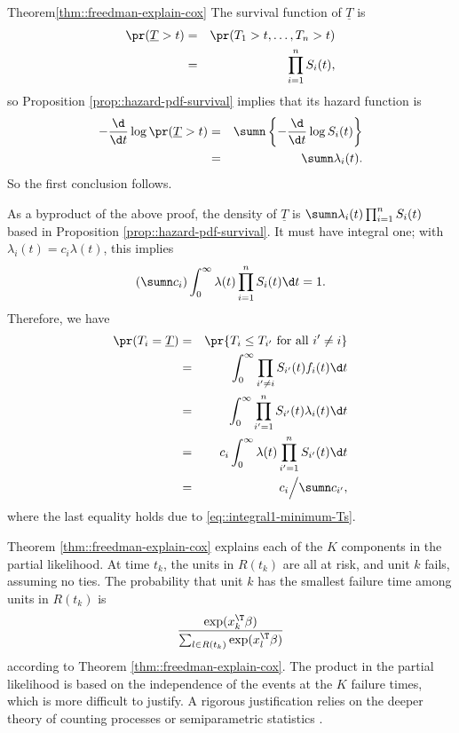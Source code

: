 \begin{myproof}{Theorem}{\ref{thm::freedman-explain-cox}}
The survival function of $\underline{T} $ is
\begin{eqnarray*}
\pr (  \underline{T} > t  ) 
&=& \pr(  T_1>t,\ldots, T_n>t ) \\
&=& \prod_{i=1}^n S_i(t) ,
\end{eqnarray*}
so Proposition \ref{prop::hazard-pdf-survival} implies that its hazard function is
\begin{eqnarray*}
- \frac{\d}{\d t} \log \pr ( \underline{T} > t )  
&=& \sumn \left\{ - \frac{\d}{\d t} \log   S_i(t) \right\} \\
&=& \sumn \lambda_i(t). 
\end{eqnarray*}
So the first conclusion follows. 
 
 
As a byproduct of the above proof, the density of $\underline{T} $ is $\sumn \lambda_i(t) \prod_{i=1}^n S_i(t)$ based in Proposition \ref{prop::hazard-pdf-survival}. It must have integral one; with $\lambda_i(t) = c_i \lambda(t)$, this implies 
\begin{equation}
\left( \sumn c_i  \right) \int_0^{\infty} \lambda(t) \prod_{i=1}^n S_i(t) \d t = 1.
\label{eq::integral1-minimum-Ts}
\end{equation}
Therefore, we have 
\begin{eqnarray*}
\pr ( T_i = \underline{T}   ) 
&=& \pr\{ T_i \leq T_{i'} \text{ for all } i' \neq i  \} \\
&=& \int_0^{\infty}   \prod_{i' \neq i} S_{i'}(t)  f_i(t) \d t\\
&=&  \int_0^{\infty}   \prod_{i'=1}^n S_{i'}(t)  \lambda_i(t) \d t \\
&=& c_i  \int_0^{\infty}  \lambda(t)   \prod_{i'=1}^n S_{i'}(t)  \d t \\
&=& c_i  \Big /  \sumn c_{i'},
\end{eqnarray*}
where the last equality holds due to \eqref{eq::integral1-minimum-Ts}. 
\end{myproof}

Theorem \ref{thm::freedman-explain-cox} explains each of the $K$ components in the partial likelihood. At time $t_k$, the units in $R(t_k)$ are all at risk, and unit $k$ fails, assuming no ties. The probability that unit $k$ has the smallest failure time among units in $R(t_k)$ is 
$$
 \frac{   \exp(x_k^{\T} \beta)  }{ \sum_{l\in R(t_k)}    \exp(x_l^{\T} \beta) } 
$$
according to Theorem \ref{thm::freedman-explain-cox}. The product in the partial likelihood is based on the independence of the events at the $K$ failure times, which is more difficult to justify. A rigorous justification relies on the deeper theory of counting processes \citep{fleming2011counting} or semiparametric statistics \citep{tsiatis2007semiparametric}. 



